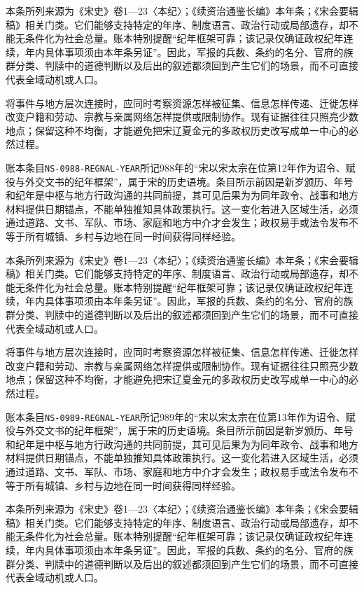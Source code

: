 本条所列来源为《宋史》卷1—23〈本纪〉；《续资治通鉴长编》本年条；《宋会要辑稿》相关门类。它们能够支持特定的年序、制度语言、政治行动或局部遗存，却不能无条件化为社会总量。账本特别提醒“纪年框架可靠；该记录仅确证政权纪年连续，年内具体事项须由本年条另证”。因此，军报的兵数、条约的名分、官府的族群分类、判牍中的道德判断以及后出的叙述都须回到产生它们的场景，而不可直接代表全域动机或人口。

将事件与地方层次连接时，应同时考察资源怎样被征集、信息怎样传递、迁徙怎样改变户籍和劳动、宗教与亲属网络怎样提供或限制协作。现有证据往往只照亮少数地点；保留这种不均衡，才能避免把宋辽夏金元的多政权历史改写成单一中心的必然过程。

账本条目\texttt{NS-0988-REGNAL-YEAR}所记988年的“宋以宋太宗在位第12年作为诏令、赋役与外交文书的纪年框架”，属于宋的历史语境。条目所示前因是新岁颁历、年号和纪年是中枢与地方行政沟通的共同前提，其可见后果为为同年政令、战事和地方材料提供日期锚点，不能单独推知具体政策执行。这一变化若进入区域生活，必须通过道路、文书、军队、市场、家庭和地方中介才会发生；政权易手或法令发布不等于所有城镇、乡村与边地在同一时间获得同样经验。

本条所列来源为《宋史》卷1—23〈本纪〉；《续资治通鉴长编》本年条；《宋会要辑稿》相关门类。它们能够支持特定的年序、制度语言、政治行动或局部遗存，却不能无条件化为社会总量。账本特别提醒“纪年框架可靠；该记录仅确证政权纪年连续，年内具体事项须由本年条另证”。因此，军报的兵数、条约的名分、官府的族群分类、判牍中的道德判断以及后出的叙述都须回到产生它们的场景，而不可直接代表全域动机或人口。

将事件与地方层次连接时，应同时考察资源怎样被征集、信息怎样传递、迁徙怎样改变户籍和劳动、宗教与亲属网络怎样提供或限制协作。现有证据往往只照亮少数地点；保留这种不均衡，才能避免把宋辽夏金元的多政权历史改写成单一中心的必然过程。

账本条目\texttt{NS-0989-REGNAL-YEAR}所记989年的“宋以宋太宗在位第13年作为诏令、赋役与外交文书的纪年框架”，属于宋的历史语境。条目所示前因是新岁颁历、年号和纪年是中枢与地方行政沟通的共同前提，其可见后果为为同年政令、战事和地方材料提供日期锚点，不能单独推知具体政策执行。这一变化若进入区域生活，必须通过道路、文书、军队、市场、家庭和地方中介才会发生；政权易手或法令发布不等于所有城镇、乡村与边地在同一时间获得同样经验。

本条所列来源为《宋史》卷1—23〈本纪〉；《续资治通鉴长编》本年条；《宋会要辑稿》相关门类。它们能够支持特定的年序、制度语言、政治行动或局部遗存，却不能无条件化为社会总量。账本特别提醒“纪年框架可靠；该记录仅确证政权纪年连续，年内具体事项须由本年条另证”。因此，军报的兵数、条约的名分、官府的族群分类、判牍中的道德判断以及后出的叙述都须回到产生它们的场景，而不可直接代表全域动机或人口。

